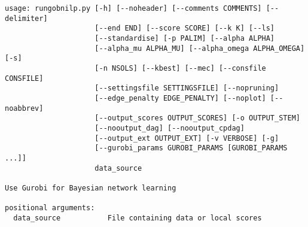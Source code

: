 \documentclass{article}
\begin{document}
\begin{verbatim}
usage: rungobnilp.py [-h] [--noheader] [--comments COMMENTS] [--delimiter]
                     [--end END] [--score SCORE] [--k K] [--ls]
                     [--standardise] [-p PALIM] [--alpha ALPHA]
                     [--alpha_mu ALPHA_MU] [--alpha_omega ALPHA_OMEGA] [-s]
                     [-n NSOLS] [--kbest] [--mec] [--consfile CONSFILE]
                     [--settingsfile SETTINGSFILE] [--nopruning]
                     [--edge_penalty EDGE_PENALTY] [--noplot] [--noabbrev]
                     [--output_scores OUTPUT_SCORES] [-o OUTPUT_STEM]
                     [--nooutput_dag] [--nooutput_cpdag]
                     [--output_ext OUTPUT_EXT] [-v VERBOSE] [-g]
                     [--gurobi_params GUROBI_PARAMS [GUROBI_PARAMS ...]]
                     data_source

Use Gurobi for Bayesian network learning

positional arguments:
  data_source           File containing data or local scores


\end{verbatim}
\end{document}
